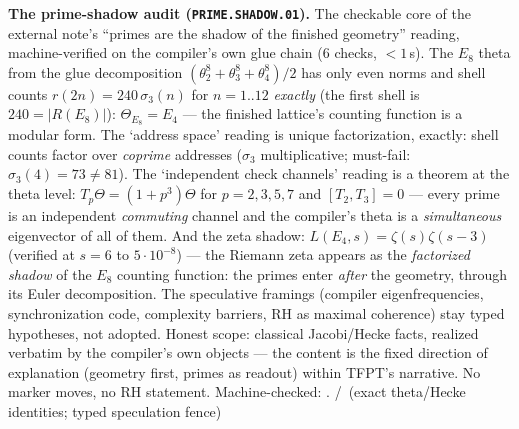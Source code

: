 \documentclass[11pt,a4paper]{article}
\theoremstyle{definition}
\begin{document}
\par\smallskip\noindent\textbf{The prime-shadow audit
(\texttt{PRIME.SHADOW.01}).}
The checkable core of the external note's ``primes are the shadow of
the finished geometry'' reading, machine-verified on the compiler's
own glue chain ($6$ checks, ${<}1$\,s).  The $E_8$ theta from the
glue decomposition $(\theta_2^8+\theta_3^8+\theta_4^8)/2$ has only
even norms and shell counts $r(2n)=240\,\sigma_3(n)$ for $n=1..12$
\emph{exactly} (the first shell is $240=|R(E_8)|$):
$\Theta_{E_8}=E_4$ --- the finished lattice's counting function is a
modular form.  The `address space' reading is unique factorization,
exactly: shell counts factor over \emph{coprime} addresses
($\sigma_3$ multiplicative; must-fail: $\sigma_3(4)=73\ne81$).  The
`independent check channels' reading is a theorem at the theta
level: $T_p\Theta=(1{+}p^3)\Theta$ for $p=2,3,5,7$ and
$[T_2,T_3]=0$ --- every prime is an independent \emph{commuting}
channel and the compiler's theta is a \emph{simultaneous}
eigenvector of all of them.  And the zeta shadow:
$L(E_4,s)=\zeta(s)\zeta(s{-}3)$ (verified at $s=6$ to
$5\cdot10^{-8}$) --- the Riemann zeta appears as the
\emph{factorized shadow} of the $E_8$ counting function: the primes
enter \emph{after} the geometry, through its Euler decomposition.
The speculative framings (compiler eigenfrequencies, synchronization
code, complexity barriers, RH as maximal coherence) stay typed
hypotheses, not adopted.  Honest scope: classical Jacobi/Hecke
facts, realized verbatim by the compiler's own objects --- the
content is the fixed direction of explanation (geometry first,
primes as readout) within TFPT's narrative.  No marker moves, no RH
statement.
Machine-checked: .
\mE/\mC\ (exact theta/Hecke identities; typed speculation fence)
\par\smallskip
\end{document}
